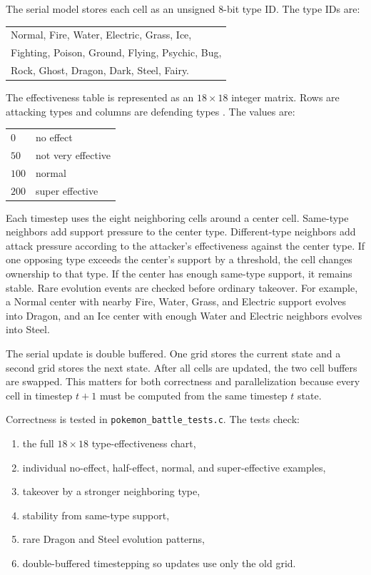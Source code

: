 \documentclass[10pt,twocolumn]{article}
\begin{document}
The serial model stores each cell as an unsigned 8-bit type ID. The type IDs are:

\begin{center}
\small
\begin{tabular}{l}
Normal, Fire, Water, Electric, Grass, Ice, \\
Fighting, Poison, Ground, Flying, Psychic, Bug, \\
Rock, Ghost, Dragon, Dark, Steel, Fairy.
\end{tabular}
\end{center}

The effectiveness table is represented as an $18 \times 18$ integer matrix. Rows are attacking types and columns are defending types \cite{pokemonchart}. The values are:
\begin{center}
\small
\begin{tabular}{ll}
$0$ & no effect \\
$50$ & not very effective \\
$100$ & normal \\
$200$ & super effective
\end{tabular}
\end{center}

Each timestep uses the eight neighboring cells around a center cell. Same-type neighbors add support pressure to the center type. Different-type neighbors add attack pressure according to the attacker's effectiveness against the center type. If one opposing type exceeds the center's support by a threshold, the cell changes ownership to that type. If the center has enough same-type support, it remains stable. Rare evolution events are checked before ordinary takeover. For example, a Normal center with nearby Fire, Water, Grass, and Electric support evolves into Dragon, and an Ice center with enough Water and Electric neighbors evolves into Steel.

The serial update is double buffered. One grid stores the current state and a second grid stores the next state. After all cells are updated, the two cell buffers are swapped. This matters for both correctness and parallelization because every cell in timestep $t+1$ must be computed from the same timestep $t$ state.

Correctness is tested in \texttt{pokemon\_battle\_tests.c}. The tests check:
\begin{enumerate}
\item the full $18 \times 18$ type-effectiveness chart,
\item individual no-effect, half-effect, normal, and super-effective examples,
\item takeover by a stronger neighboring type,
\item stability from same-type support,
\item rare Dragon and Steel evolution patterns,
\item double-buffered timestepping so updates use only the old grid.
\end{enumerate}
\end{document}
